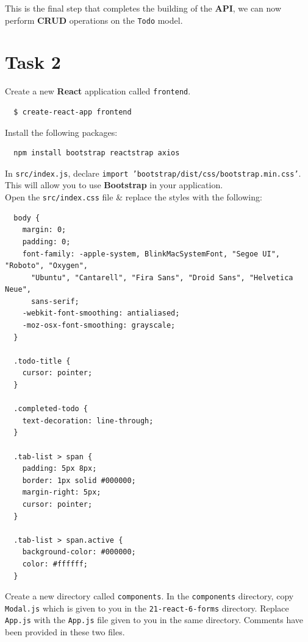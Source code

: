 \documentclass{article}
\begin{document}
This is the final step that completes the building of the \textbf{API}, we can now perform \textbf{CRUD} operations on the \texttt{Todo} model. 

\section*{Task 2} 

Create a new \textbf{React} application called \texttt{frontend}.

\begin{verbatim}
  $ create-react-app frontend
\end{verbatim}

Install the following packages:

\begin{verbatim}
  npm install bootstrap reactstrap axios
\end{verbatim}

In \texttt{src/index.js}, declare \texttt{import 'bootstrap/dist/css/bootstrap.min.css'}. This will allow you to use \textbf{Bootstrap} in your application. \\

Open the \texttt{src/index.css} file \& replace the styles with the following:

\begin{verbatim}
  body {
    margin: 0;
    padding: 0;
    font-family: -apple-system, BlinkMacSystemFont, "Segoe UI", "Roboto", "Oxygen",
      "Ubuntu", "Cantarell", "Fira Sans", "Droid Sans", "Helvetica Neue",
      sans-serif;
    -webkit-font-smoothing: antialiased;
    -moz-osx-font-smoothing: grayscale;
  }

  .todo-title {
    cursor: pointer;
  }

  .completed-todo {
    text-decoration: line-through;
  }

  .tab-list > span {
    padding: 5px 8px;
    border: 1px solid #000000;
    margin-right: 5px;
    cursor: pointer;
  }

  .tab-list > span.active {
    background-color: #000000;
    color: #ffffff;
  }
\end{verbatim}

Create a new directory called \texttt{components}. In the \texttt{components} directory, copy \texttt{Modal.js} which is given to you in the \texttt{21-react-6-forms} directory. Replace \texttt{App.js} with the \texttt{App.js} file given to you in the same directory. Comments have been provided in these two files. \\
\end{document}
